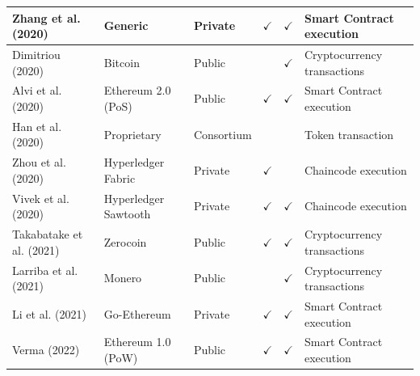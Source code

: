 \documentclass[../access.tex]{subfiles}
\begin{document}
\begin{table}[htbp]
\begin{adjustwidth}{-1cm}{}
\begin{tabular}{m{4.4cm} >{\centering\arraybackslash}m{2.9cm} >{\centering\arraybackslash}m{1.0cm} >{\centering\arraybackslash}m{1.0cm} >{\centering\arraybackslash}m{1.5cm} >{\centering\arraybackslash}m{3.6cm}}
                    \hline
                    \footnotesize{Zhang et al. (2020) \cite{Zhang2020}} & \footnotesize{Generic} & \footnotesize{Private} & $ \checkmark $ & $ \checkmark $ & \footnotesize{Smart Contract execution} \\
                    \hline
                    \footnotesize{Dimitriou (2020) \cite{Dimitriou2020}} & \footnotesize{Bitcoin} & \footnotesize{Public} & {} & $ \checkmark $ & \footnotesize{Cryptocurrency transactions} \\
                    \hline
                    \footnotesize{Alvi et al. (2020) \cite{Alvi2020}} & \footnotesize{Ethereum 2.0 (PoS)} & \footnotesize{Public} & $ \checkmark $ & $ \checkmark $ & \footnotesize{Smart Contract execution} \\
                    \hline
                    \footnotesize{Han et al. (2020) \cite{Han2020}} & \footnotesize{Proprietary} & \footnotesize{Consortium} & {} & {} & \footnotesize{Token transaction} \\
                    \hline
                    \footnotesize{Zhou et al. (2020) \cite{Zhou2020}} & \footnotesize{Hyperledger Fabric} & \footnotesize{Private} & $ \checkmark $ & {} & \footnotesize{Chaincode execution} \\
                    \hline
                    \footnotesize{Vivek et al. (2020) \cite{Vivek2020}} & \footnotesize{Hyperledger Sawtooth} & \footnotesize{Private} & $ \checkmark $ & $ \checkmark $ & \footnotesize{Chaincode execution} \\
                    \hline
                    \footnotesize{Takabatake et al. (2021) \cite{Takabatake2021}} & \footnotesize{Zerocoin} & \footnotesize{Public} & $ \checkmark $ & $ \checkmark $ & \footnotesize{Cryptocurrency transactions} \\
                    \hline
                    \footnotesize{Larriba et al. (2021) \cite{Larriba2021}} & \footnotesize{Monero} & \footnotesize{Public} & {} & $ \checkmark $ & \footnotesize{Cryptocurrency transactions} \\
                    \hline
                    \footnotesize{Li et al. (2021) \cite{Li2021}} & \footnotesize{Go-Ethereum} & \footnotesize{Private} & $ \checkmark $ & $ \checkmark $ & \footnotesize{Smart Contract execution} \\
                    \hline
                    \footnotesize{Verma (2022) \cite{Verma2022}} & \footnotesize{Ethereum 1.0 (PoW)} & \footnotesize{Public} & $ \checkmark $ & $ \checkmark $ & \footnotesize{Smart Contract execution} \\

\end{tabular}
\end{adjustwidth}
\end{table}
\end{document}
